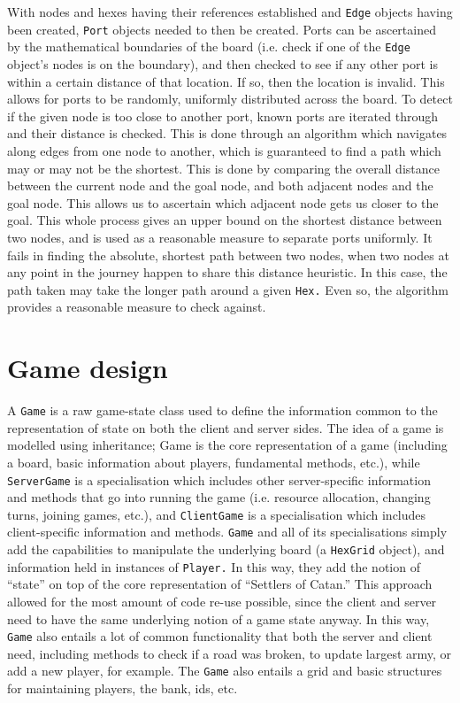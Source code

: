 \documentclass[a4paper,doc]{apa6}
\newcommand{\code}{\texttt}
\begin{document}
With nodes and hexes having their references established and \code{Edge} objects having been created, \code{Port} objects needed to then be created. Ports can be ascertained by the mathematical boundaries of the board (i.e. check if one of the \code{Edge} object’s nodes is on the boundary), and then checked to see if any other port is within a certain distance of that location. If so, then the location is invalid. This allows for ports to be randomly, uniformly distributed across the board. To detect if the given node is too close to another port, known ports are iterated through and their distance is checked. This is done through an algorithm which navigates along edges from one node to another, which is guaranteed to find a path which may or may not be the shortest. This is done by comparing the overall distance between the current node and the goal node, and both adjacent nodes and the goal node. This allows us to ascertain which adjacent node gets us closer to the goal. This whole process gives an upper bound on the shortest distance between two nodes, and is used as a reasonable measure to separate ports uniformly. It fails in finding the absolute, shortest path between two nodes, when two nodes at any point in the journey happen to share this distance heuristic. In this case, the path taken may take the longer path around a given \code{Hex.} Even so, the algorithm provides a reasonable measure to check against.

\section{Game design}
A \code{Game} is a raw game-state class used to define the information common to the representation of state on both the client and server sides. The idea of a game is modelled using inheritance; Game is the core representation of a game (including a board, basic information about players, fundamental methods, etc.), while \code{ServerGame} is a specialisation which includes other server-specific information and methods that go into running the game (i.e. resource allocation, changing turns, joining games, etc.), and \code{ClientGame} is a specialisation which includes client-specific information and methods. \code{Game} and all of its specialisations simply add the capabilities to manipulate the underlying board (a \code{HexGrid} object), and information held in instances of \code{Player.} In this way, they add the notion of “state” on top of the core representation of “Settlers of Catan.” This approach allowed for the most amount of code re-use possible, since the client and server need to have the same underlying notion of a game state anyway. In this way, \code{Game} also entails a lot of common functionality that both the server and client need, including methods to check if a road was broken, to update largest army, or add a new player, for example. The \code{Game} also entails a grid and basic structures for maintaining players, the bank, ids, etc.
\end{document}
